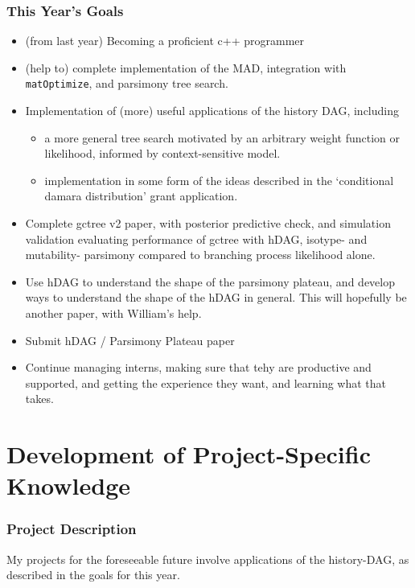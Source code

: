 \documentclass{paper}
\begin{document}
\subsubsection*{This Year's Goals}
\begin{itemize}
    \item (from last year) Becoming a proficient c++ programmer
    \item (help to) complete implementation of the MAD, integration with \texttt{matOptimize}, and parsimony tree search.
    \item Implementation of (more) useful applications of the history DAG, including
        \begin{itemize}
            \item a more general tree search motivated by an arbitrary weight function or likelihood, informed by context-sensitive model.
            \item implementation in some form of the ideas described in the `conditional damara distribution' grant application.
        \end{itemize}
    \item Complete gctree v2 paper, with posterior predictive check, and simulation validation evaluating performance of gctree with hDAG, isotype- and mutability- parsimony compared to branching process likelihood alone.
    \item Use hDAG to understand the shape of the  parsimony plateau, and develop ways to understand the shape of the hDAG in general. This will hopefully be another paper, with William's help.
    \item Submit hDAG / Parsimony Plateau paper
    \item Continue managing interns, making sure that tehy are productive and supported, and getting the experience they want, and learning what that takes.
\end{itemize}

\section*{Development of Project-Specific Knowledge}
\subsubsection*{Project Description}
My projects for the foreseeable future involve applications of the history-DAG, as described in the goals for this year.
\end{document}
